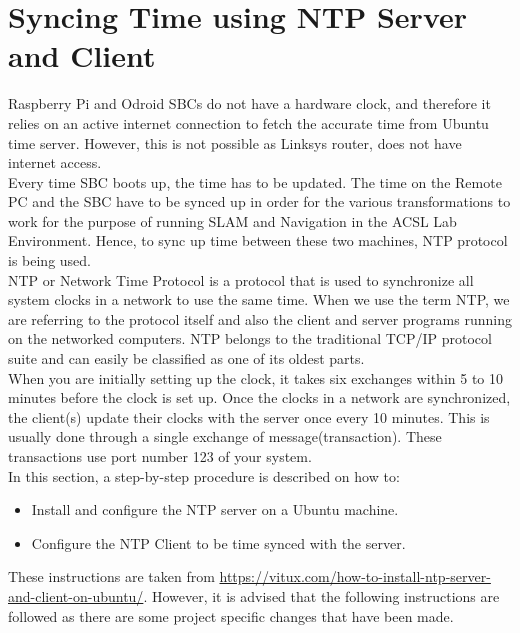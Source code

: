 \documentclass[12]{article}
\begin{document}
\section{Syncing Time using NTP Server and Client}
Raspberry Pi and Odroid SBCs do not have a hardware clock, and therefore it relies on an active internet connection to fetch the accurate time from Ubuntu time server. However, this is not possible as Linksys router, does not have internet access.\\
Every time SBC boots up, the time has to be updated. The time on the Remote PC and the SBC have to be synced up in order for the various transformations to work for the purpose of running SLAM and Navigation in the ACSL Lab Environment. Hence, to sync up time between these two machines, NTP protocol is being used.\\
NTP or Network Time Protocol is a protocol that is used to synchronize all system clocks in a network to use the same time. When we use the term NTP, we are referring to the protocol itself and also the client and server programs running on the networked computers. NTP belongs to the traditional TCP/IP protocol suite and can easily be classified as one of its oldest parts.\\
When you are initially setting up the clock, it takes six exchanges within 5 to 10 minutes before the clock is set up. Once the clocks in a network are synchronized, the client(s) update their clocks with the server once every 10 minutes. This is usually done through a single exchange of message(transaction). These transactions use port number 123 of your system.\\
In this section, a step-by-step procedure is described on how to:
\begin{itemize}
	\item{Install and configure the NTP server on a Ubuntu machine.}
	\item{Configure the NTP Client to be time synced with the server.}
\end{itemize}
These instructions are taken from \url{https://vitux.com/how-to-install-ntp-server-and-client-on-ubuntu/}. However, it is advised that the following instructions are followed as there are some project specific changes that have been made.
\end{document}
